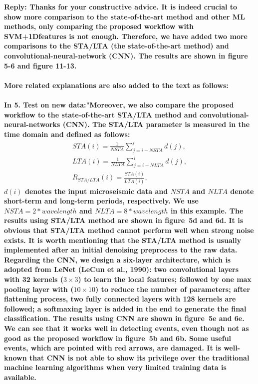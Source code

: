 \begin{enumerate}
\textbf{Reply: Thanks for your constructive advice. It is indeed crucial to show more comparison to the state-of-the-art method and other ML methods, only comparing the proposed workflow with SVM+1Dfeatures is not enough. Therefore, we have added two more comparisons to the STA/LTA (the state-of-the-art method) and convolutional-neural-network (CNN). The results are shown in figure 5-6 and figure 11-13. \\ \\
More related explanations are also added to the text as follows:\\ \\
In \textbf{5. Test on new data}:"Moreover, we also compare the proposed workflow to the state-of-the-art STA/LTA method and convolutional-neural-networks (CNN). The STA/LTA parameter is measured in the time domain and defined as follows:
\begin{equation}
\begin{split}
      STA\left( i \right) = \frac{1}{NSTA} \sum_{j=i-NSTA}^{i} d\left(j\right),\\
      LTA\left( i \right) = \frac{1}{NLTA} \sum_{j=i-NLTA}^{i} d\left(j\right),\\
      R_{STA/LTA}\left( i \right) = \frac{STA\left( i \right)}{LTA\left( i \right)},
\label{eq3}
\end{split}
\end{equation}
$d\left(i\right)$ denotes the input microseismic data and $NSTA$ and $NLTA$ denote short-term and long-term periods, respectively. We use $NSTA=2*wavelength$ and $NLTA=8*wavelength$ in this example. The results using STA/LTA method are shown in figure~5d and 6d. It is obvious that STA/LTA method cannot perform well when strong noise exists. It is worth mentioning that the STA/LTA method is usually implemented after an initial denoising preprocess to the raw data. \\
Regarding the CNN, we design a six-layer architecture, which is adopted from LeNet (LeCun et al., 1990): two convolutional layers with 32 kernels ($3\times3$) to learn the local features; followed by one max pooling layer with ($10\times10$) to reduce the number of parameters; after flattening process, two fully connected layers with 128 kernels are followed; a softmaxing layer is added in the end to generate the final classification. The results using CNN are shown in figure~5e and 6e. We can see that it works well in detecting events, even though not as good as the proposed workflow in figure~5b and 6b. Some useful events, which are pointed with red arrows, are damaged. It is well-known that CNN is not able to show its privilege over the traditional machine learning algorithms when very limited training data is available.  \\
}
\end{enumerate}
